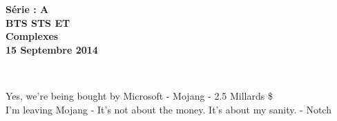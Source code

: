 \documentclass[11pt]{article}
\begin{document}

\begin{minipage}[t]{\textwidth}
  \raggedright
      {\bfseries Série : \textbf{A}}\\
      {\bfseries BTS STS ET}\\[.35ex]
      \vspace*{-1cm}
      \raggedleft
          {\bfseries Complexes}\\[.35ex]
          {\bfseries 15 Septembre 2014}\\[.35ex]
\end{minipage}\\[1em]

\begin{center}
  \textsf{Yes, we’re being bought by Microsoft - Mojang - 2.5 Millards \$}\\
  \textsf{I’m leaving Mojang - It’s not about the money. It’s about my sanity. - Notch}
\end{center}

\setlength{\columnseprule}{1pt}
\end{document}
